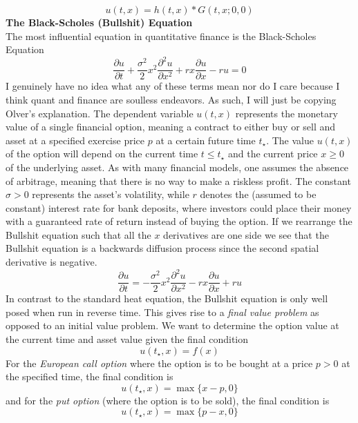 \documentclass{article}
\newcommand{\pd}[2]{\frac{\partial #1}{\partial #2}}
\newcommand{\pdt}[2]{\frac{\partial ^2 #1}{\partial #2 ^2}}
\numberwithin{equation}{section}
\begin{document}
\begin{equation}
    u(t,x) = h(t,x) * G(t,x;0,0)
\end{equation}
\textbf{The Black-Scholes (Bullshit) Equation}\\
The most influential equation in quantitative finance is the Black-Scholes Equation
\begin{equation}
    \pd{u}{t} +\frac{\sigma^2}{2}x^2\pdt{u}{x}+rx\pd{u}{x} -ru= 0
\end{equation}
I genuinely have no idea what any of these terms mean nor do I care because I think quant and finance are soulless endeavors. As such, I will just be copying Olver's explanation. The dependent variable $u(t,x)$ represents the monetary value of a single financial option, meaning a contract to either buy or sell and asset at a specified exercise price $p$ at a certain future time $t_\star$. The value $u(t,x)$ of the option will depend on the current time $t\leq t_\star$ and the current price $x\geq0$ of the underlying asset. As with many financial models, one assumes the absence of arbitrage, meaning that there is no way to make a riskless profit. The constant $\sigma>0$ represents the asset's volatility, while $r$ denotes the (assumed to be constant) interest rate for bank deposits, where investors could place their money with a guaranteed rate of return instead of buying the option. If we rearrange the Bullshit equation such that all the $x$ derivatives are one side we see that the Bullshit equation is a backwards diffusion process since the second spatial derivative is negative. 
\begin{equation}
    \pd{u}{t} = -\frac{\sigma^2}{2}x^2\pdt{u}{x}-rx\pd{u}{x} +ru 
\end{equation}
In contrast to the standard heat equation, the Bullshit equation is only well posed when run in reverse time. This gives rise to a \textit{final value problem} as opposed to an initial value problem. We want to determine the option value at the current time and asset value given the final condition
\begin{equation}
    u(t_\star,x) =f(x)
\end{equation}
For the \textit{European call option} where the option is to be bought at a price $p > 0$ at the specified time, the final condition is 
\begin{equation*}
    u(t_\star,x) = \max \{x-p,0\}
\end{equation*}
and for the \textit{put option} (where the option is to be sold), the final condition is 
\begin{equation*}
    u(t_\star,x) = \max \{p-x,0\}
\end{equation*}
\end{document}

